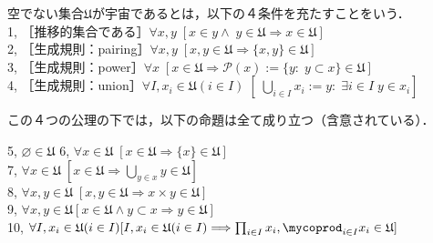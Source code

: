 \documentclass[uplatex, 12pt, a4paper, dvipdfmx]{jsarticle}
\let\coprod\mycoprod
\begin{document}
\begin{shadebox}\begin{definition}[Grothendieck宇宙]
    空でない集合$\mathfrak{U}$が宇宙であるとは，以下の４条件を充たすことをいう．\\
    1, ［推移的集合である］$\forall x,y \; [x\in y \wedge \; y\in \mathfrak{U} \Longrightarrow x\in \mathfrak{U}]$\\
    2, ［生成規則：pairing］$\forall x,y \; [x,y\in \mathfrak{U} \Longrightarrow \{ x,y\} \in \mathfrak{U}]$\\
    3, ［生成規則：power］$\forall x \; [x\in\mathfrak{U} \Longrightarrow \mathcal{P}(x):=\{ y:\; y \subset x\} \in \mathfrak{U}]$\\
    4, ［生成規則：union］$\forall I,x_i \in \mathfrak{U}(i\in I) \; [\; \bigcup_{i\in I} x_i := {y:\; \exists i\in I \; y\in x_i}]$
\end{definition}\end{shadebox}

この４つの公理の下では，以下の命題は全て成り立つ（含意されている）．
\begin{shadebox}
    5, $\varnothing\in\mathfrak{U}$
    6, $\forall x\in\mathfrak{U} \; [x\in\mathfrak{U}\Longrightarrow \{ x \} \in \mathfrak{U}]$\\
    7, $\forall x\in\mathfrak{U} \; [x\in\mathfrak{U}\Longrightarrow \bigcup_{y\in x}y\in\mathfrak{U}]$\\
    8, $\forall x,y\in\mathfrak{U} \; [x,y \in\mathfrak{U}\Longrightarrow x\times y\in\mathfrak{U}]$\\
    9, $\forall x,y\in\mathfrak{U} [x\in\mathfrak{U} \wedge y\subset x \Longrightarrow y\in\mathfrak{U}]$\\
    10, $\forall I,x_i\in\mathfrak{U}(i\in I) [I,x_i\in\mathfrak{U}(i\in I)\Longrightarrow \prod_{i\in I}x_i , \coprod_{i\in I}x_i\in\mathfrak{U}]$
\end{shadebox}
\end{document}
